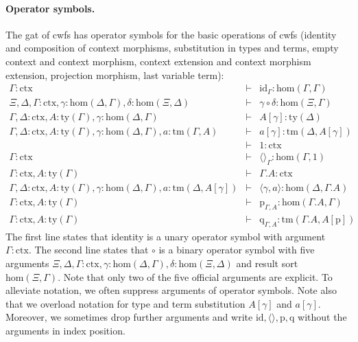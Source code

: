 \documentclass[11pt,a4paper]{article}
\theoremstyle{plain}
\theoremstyle{definition}
\newcommand{\id}{\mathsf{id}}
\def\sub{\mathrm{hom}}
\def\id{\mathrm{id}}
\newcommand{\ctx}{\mathrm{ctx}}
\newcommand{\ty}{\mathrm{ty}}
\newcommand{\tm}{\mathrm{tm}}
\newcommand{\tuple}[1]{\langle #1 \rangle}
\newcommand{\cext}{.}
\def\p{\mathrm{p}}
\def\q{\mathrm{q}}
\begin{document}
\paragraph{Operator symbols.}
The gat of cwfs has operator symbols for the basic operations of cwfs (identity and composition of context morphisms, substitution in types and terms, empty context and context morphism, context extension and context morphism extension, projection morphism, last variable term):
\begin{eqnarray*}
\Gamma : \ctx &\vdash& \id_{\Gamma} : \sub(\Gamma,\Gamma)\\
\Xi,\Delta,\Gamma : \ctx, \gamma : \sub(\Delta,\Gamma), \delta : \sub(\Xi,\Delta) &\vdash&
\gamma \circ \delta : \sub(\Xi,\Gamma)\\
\Gamma,\Delta : \ctx, A:\ty(\Gamma), \gamma : \sub(\Delta,\Gamma) &\vdash&
A[\gamma] : \ty(\Delta)\\
\Gamma,\Delta : \ctx, A:\ty(\Gamma), \gamma : \sub(\Delta,\Gamma), a:\tm(\Gamma,A) &\vdash&  a[\gamma] : \tm(\Delta,A[\gamma])\\
&\vdash& 1 : \ctx\\
\Gamma : \ctx &\vdash& \tuple{}_\Gamma : \sub(\Gamma,1)\\
\Gamma : \ctx, A:\ty(\Gamma) &\vdash& \Gamma\cext A : \ctx\\
\Gamma,\Delta : \ctx, A:\ty(\Gamma), \gamma : \sub(\Delta,\Gamma), a:\tm(\Delta,A[\gamma]) &\vdash& \tuple{\gamma,a} : \sub(\Delta,\Gamma\cext A)\\
\Gamma : \ctx, A:\ty(\Gamma) &\vdash& \p_{\Gamma,A}: \sub(\Gamma\cext A,\Gamma)\\
\Gamma : \ctx, A:\ty(\Gamma) &\vdash& \q_{\Gamma,A}: \tm(\Gamma\cext A,A[\p])
\end{eqnarray*}
The first line states that identity is a unary operator symbol with argument $\Gamma : \ctx$. The second line states that $\circ$ is a binary operator symbol with five arguments $\Xi,\Delta,\Gamma : \ctx, \gamma : \sub(\Delta,\Gamma), \delta : \sub(\Xi,\Delta)$ and result sort $\sub(\Xi,\Gamma)$. Note that only two of the five official arguments are explicit. To alleviate notation, we often suppress arguments of operator symbols. Note also that we overload notation for type and term substitution $A[\gamma]$ and $a[\gamma]$. Moreover, we sometimes drop further arguments and write $\id, \tuple{},\p,\q$ without the arguments in index position.
\end{document}
